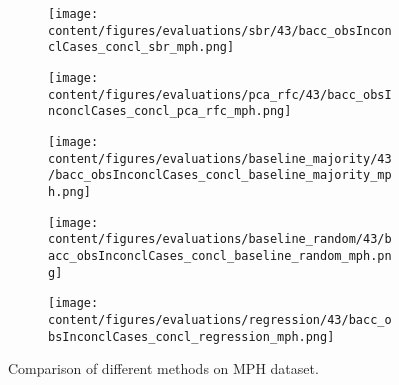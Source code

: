 \begin{figure}[t]
  \begin{subfigure}{0.5\textwidth}
    \centering
    \texttt{[image: content/figures/evaluations/sbr/43/bacc\_obsInconclCases\_concl\_sbr\_mph.png]}
  \end{subfigure}
  \hfill
  \begin{subfigure}{0.5\textwidth}
    \centering
    \texttt{[image: content/figures/evaluations/pca\_rfc/43/bacc\_obsInconclCases\_concl\_pca\_rfc\_mph.png]}
  \end{subfigure}
  \hfill
  \begin{subfigure}{0.5\textwidth}
    \centering
    \texttt{[image: content/figures/evaluations/baseline\_majority/43/bacc\_obsInconclCases\_concl\_baseline\_majority\_mph.png]}
  \end{subfigure}
  \hfill
  \begin{subfigure}{0.5\textwidth}
    \centering
    \texttt{[image: content/figures/evaluations/baseline\_random/43/bacc\_obsInconclCases\_concl\_baseline\_random\_mph.png]}
  \end{subfigure}
  \hfill
  \begin{subfigure}{0.5\textwidth}
    \centering
    \texttt{[image: content/figures/evaluations/regression/43/bacc\_obsInconclCases\_concl\_regression\_mph.png]}
  \end{subfigure}

  \caption{Comparison of different methods on MPH dataset.}
  \label{fig:test_mph}
\end{figure}


